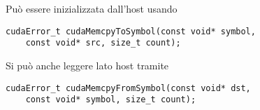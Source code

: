 \begin{questions}
\begin{solution}
        Può essere inizializzata dall'host usando
        \begin{verbatim}
cudaError_t cudaMemcpyToSymbol(const void* symbol,
    const void* src, size_t count);
        \end{verbatim}
        Si può anche leggere lato host tramite
        \begin{verbatim}
cudaError_t cudaMemcpyFromSymbol(const void* dst, 
    const void* symbol, size_t count);
        \end{verbatim}
    \end{solution}
    
\end{questions}